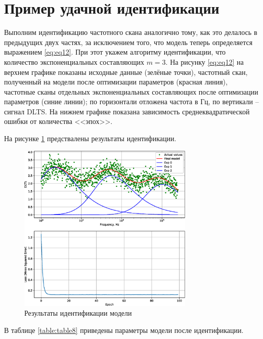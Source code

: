 \documentclass{report}
\begin{document}
        \section{Пример удачной идентификации}
        Выполним идентификацию частотного скана аналогично тому, как это делалось в 
        предыдущих двух частях, за исключением того, что модель теперь определяется 
        выражением \ref{eq:eq12}. При этот укажем алгоритму идентификации, что 
        количество экспоненциальных составляющих $m = 3$. На рисунку \ref{eq:eq12} на
        верхнем графике показаны исходные данные (зелёные точки), частотный скан, 
        полученный на модели после оптимизации параметров (красная линия), частотные 
        сканы отдельных экспоненциальных составляющих после оптимизации параметров 
        (синие линии); по горизонтали отложена частота в Гц, по вертикали – сигнал DLTS. 
        На нижнем графике показана зависимость среднеквадратической ошибки от 
        количества <<эпох>>.

        На рисунке \ref{pic:pic6} предствалены результаты идентификации.
        \begin{figure}[ht]
            \centering
            \includegraphics[width=0.75\textwidth]{multiexp_SGD}
            \caption{Результаты идентификации модели}
            \label{pic:pic6}
        \end{figure}

        В таблице \ref{table:table8} приведены параметры модели после идентификации.
\end{document}
